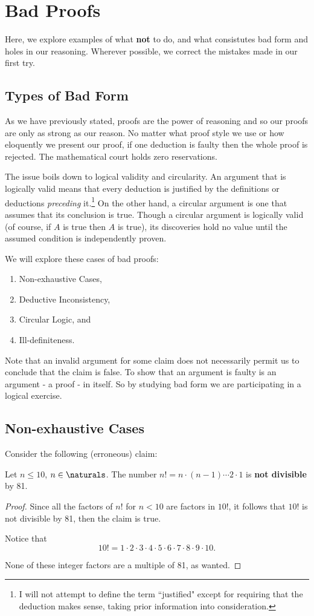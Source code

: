 \documentclass[../proofs.tex]{subfiles}
\newcommand{\ftjustified}{\footnote{I will not attempt to define the term
 ``justified" except for requiring that the deduction makes sense,
taking prior information into consideration.}}
\begin{document}
\chapter{Bad Proofs}
Here, we explore examples of what \textbf{not} to do, and what consistutes bad
form and holes in our reasoning. Wherever possible, we correct the mistakes
made in our first try.

\section{Types of Bad Form}
As we have previously stated, proofs are the power of reasoning and so our
proofs are only as strong as our reason. No matter what proof style we use or
how eloquently we present our proof, if one deduction is faulty then the whole
proof is rejected. The mathematical court holds zero reservations.

The issue boils down to logical validity and circularity. An argument
that is logically valid means that every deduction is justified by the
definitions or deductions \emph{preceding} it.\ftjustified{} On the other hand,
a circular argument is one that assumes that its conclusion is true. Though a
circular argument is logically valid (of course, if $A$ is true then $A$ is
true), its discoveries hold no value until the assumed condition is
independently proven.

We will explore these cases of bad proofs:
\begin{enumerate}
  \item Non-exhaustive Cases,
  \item Deductive Inconsistency,
  \item Circular Logic, and
  \item Ill-definiteness.
\end{enumerate}

Note that an invalid argument for some claim does not necessarily permit us
to conclude that the claim is false. To show that an argument is faulty is
an argument - a proof - in itself. So by studying bad form we are
participating in a logical exercise.

\section{Non-exhaustive Cases}
Consider the following (erroneous) claim:
\begin{claim}
  Let $n \leq 10$, $n \in \naturals$. The number $n! = n \cdot (n-1) \cdots 2
  \cdot 1$ is \textbf{not divisible} by 81.
\end{claim}
\begin{proof}
  Since all the factors of $n!$ for $n < 10$ are factors in $10!$, it follows
  that $10!$ is not divisible by 81, then the claim is true.

  Notice that
  $$10! = 1 \cdot 2 \cdot 3 \cdot 4 \cdot 5
  \cdot 6 \cdot 7 \cdot 8 \cdot 9 \cdot 10.$$

  None of these integer factors are a multiple of 81, as wanted.
\end{proof}
\end{document}
